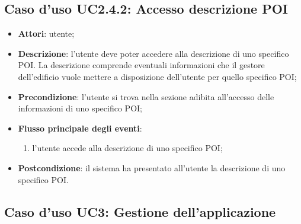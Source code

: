 \documentclass[../AnalisiDeiRequisiti.tex]{subfiles}
\begin{document}
\subsection{Caso d'uso UC2.4.2: Accesso descrizione POI}
\begin{itemize}
	\item \textbf{Attori}: utente;
	\item \textbf{Descrizione}: l'utente deve poter accedere alla descrizione di uno specifico POI. La descrizione comprende eventuali informazioni che il gestore dell'edificio vuole mettere a disposizione dell'utente per quello specifico POI; 
	\item \textbf{Precondizione}: l'utente si trova nella sezione adibita all'accesso delle informazioni di uno specifico POI;
	
	\item \textbf{Flusso principale degli eventi}:
	\begin{enumerate}
		\item l'utente accede alla descrizione di uno specifico POI;
		
	\end{enumerate}
	\item \textbf{Postcondizione}: il sistema ha presentato all'utente la descrizione di uno specifico POI.
\end{itemize}
\hypertarget{UC3}{}
\subsection{Caso d'uso UC3: Gestione dell'applicazione}
\end{document}

